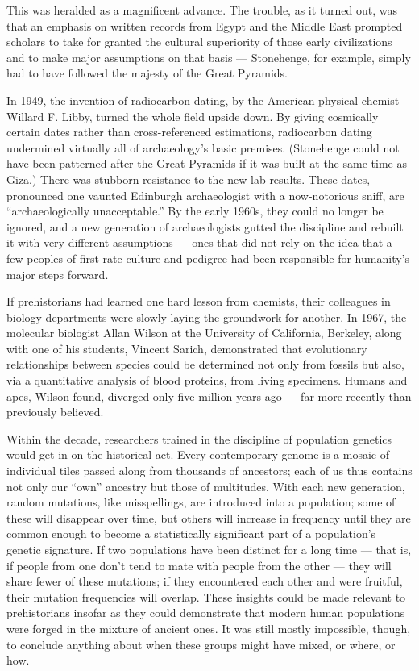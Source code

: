 This was heralded as a magnificent advance. The trouble, as it turned
out, was that an emphasis on written records from Egypt and the Middle
East prompted scholars to take for granted the cultural superiority of
those early civilizations and to make major assumptions on that basis
--- Stonehenge, for example, simply had to have followed the majesty of
the Great Pyramids.

In 1949, the invention of radiocarbon dating, by the American physical
chemist Willard F. Libby, turned the whole field upside down. By giving
cosmically certain dates rather than cross-referenced estimations,
radiocarbon dating undermined virtually all of archaeology's basic
premises. (Stonehenge could not have been patterned after the Great
Pyramids if it was built at the same time as Giza.) There was stubborn
resistance to the new lab results. These dates, pronounced one vaunted
Edinburgh archaeologist with a now-notorious sniff, are
``archaeologically unacceptable.'' By the early 1960s, they could no
longer be ignored, and a new generation of archaeologists gutted the
discipline and rebuilt it with very different assumptions --- ones that
did not rely on the idea that a few peoples of first-rate culture and
pedigree had been responsible for humanity's major steps forward.

If prehistorians had learned one hard lesson from chemists, their
colleagues in biology departments were slowly laying the groundwork for
another. In 1967, the molecular biologist Allan Wilson at the University
of California, Berkeley, along with one of his students, Vincent Sarich,
demonstrated that evolutionary relationships between species could be
determined not only from fossils but also, via a quantitative analysis
of blood proteins, from living specimens. Humans and apes, Wilson found,
diverged only five million years ago --- far more recently than
previously believed.

Within the decade, researchers trained in the discipline of population
genetics would get in on the historical act. Every contemporary genome
is a mosaic of individual tiles passed along from thousands of
ancestors; each of us thus contains not only our ``own'' ancestry but
those of multitudes. With each new generation, random mutations, like
misspellings, are introduced into a population; some of these will
disappear over time, but others will increase in frequency until they
are common enough to become a statistically significant part of a
population's genetic signature. If two populations have been distinct
for a long time --- that is, if people from one don't tend to mate with
people from the other --- they will share fewer of these mutations; if
they encountered each other and were fruitful, their mutation
frequencies will overlap. These insights could be made relevant to
prehistorians insofar as they could demonstrate that modern human
populations were forged in the mixture of ancient ones. It was still
mostly impossible, though, to conclude anything about when these groups
might have mixed, or where, or how.

